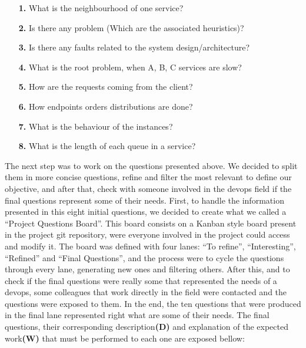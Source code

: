 \begin{itemize}
    \item[\textbf{1.}] What is the neighbourhood of one service?
    \item[\textbf{2.}] Is there any problem (Which are the associated heuristics)?
    \item[\textbf{3.}] Is there any faults related to the system design/architecture?
    \item[\textbf{4.}] What is the root problem, when A, B, C services are slow?
    \item[\textbf{5.}] How are the requests coming from the client?
    \item[\textbf{6.}] How endpoints orders distributions are done?
    \item[\textbf{7.}] What is the behaviour of the instances?
    \item[\textbf{8.}] What is the length of each queue in a service?
\end{itemize}

The next step was to work on the questions presented above. We decided to split them in more concise questions, refine and filter the most relevant to define our objective, and after that, check with someone involved in the \gls{devops} field if the final questions represent some of their needs. First, to handle the information presented in this eight initial questions, we decided to create what we called a ``Project Questions Board''. This board consists on a Kanban \cite{kanban_board} style board present in the project git repository, were everyone involved in the project could access and modify it. The board was defined with four lanes: ``To refine'', ``Interesting'', ``Refined'' and ``Final Questions'', and the process were to cycle the questions through every lane, generating new ones and filtering others. After this, and to check if the final questions were really some that represented the needs of a \gls{devops}, some colleagues that work directly in the field were contacted and the questions were exposed to them. In the end, the ten questions that were produced in the final lane represented right what are some of their needs. The final questions, their corresponding description\textbf{(D)} and explanation of the expected work\textbf{(W)} that must be performed to each one are exposed bellow:


